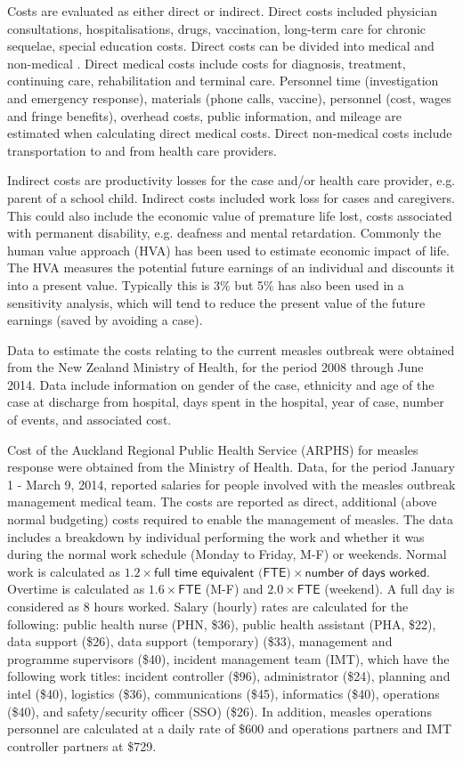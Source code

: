 \documentclass{article}
\begin{document}
Costs are evaluated as either direct or indirect. Direct costs included physician consultations, hospitalisations, drugs, vaccination, long-term care for chronic sequelae, special education costs. Direct costs can be divided into medical and non-medical \citep{saha13}. Direct medical costs include costs for diagnosis, treatment, continuing care, rehabilitation and terminal care. Personnel time (investigation and emergency response), materials (phone calls, vaccine), personnel (cost, wages and fringe benefits), overhead costs, public information, and mileage are estimated when calculating direct medical costs. Direct non-medical costs include transportation to and from health care providers.

Indirect costs are productivity losses for the case and/or health care provider, e.g. parent of a school child. Indirect costs included work loss for cases and caregivers. This could also include the economic value of premature life lost, costs associated with permanent disability, e.g. deafness and mental retardation. Commonly the human value approach (HVA) has been used to estimate economic impact of life. The HVA measures the potential future earnings of an individual and discounts it into a present value. Typically this is 3\% but 5\% has also been used in a sensitivity analysis, which will tend to reduce the present value of the future earnings (saved by avoiding a case).

Data to estimate the costs relating to the current measles outbreak were obtained from the New Zealand Ministry of Health, for the period 2008 through June 2014. Data include information on gender of the case, ethnicity and age of the case at discharge from hospital, days spent in the hospital, year of case, number of events, and associated cost.

Cost of the Auckland Regional Public Health Service (ARPHS) for measles response were obtained from the Ministry of Health. Data, for the period January 1 - March 9, 2014, reported salaries for people involved with the measles outbreak management medical team. The costs are reported as direct, additional (above normal budgeting) costs required to enable the management of measles. The data includes a breakdown by individual performing the work and whether it was during the normal work schedule (Monday to Friday, M-F) or weekends. Normal work is calculated as $1.2 \times \textsf{full time equivalent (FTE)} \times \textsf{number of days worked}$. Overtime is calculated as $1.6\times\textsf{FTE}$ (M-F) and $2.0 \times \textsf{FTE}$ (weekend). A full day is considered as 8 hours worked. Salary (hourly) rates are calculated for the following: public health nurse (PHN, \$36), public health assistant (PHA, \$22), data support (\$26), data support (temporary) (\$33), management and programme supervisors (\$40), incident management team (IMT), which have the following work titles: incident controller (\$96), administrator (\$24), planning and intel (\$40), logistics (\$36), communications (\$45), informatics (\$40), operations (\$40), and safety/security officer (SSO) (\$26). In addition, measles operations personnel are calculated at a daily rate of \$600 and operations partners and IMT controller partners at \$729.
\end{document}

